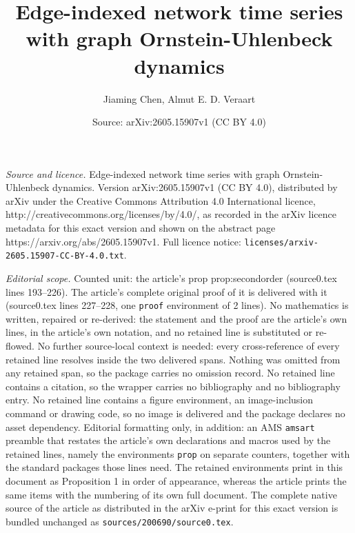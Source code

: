 \documentclass[10pt,a4paper]{amsart}
\title{Edge-indexed network time series with graph Ornstein-Uhlenbeck dynamics}
\author{Jiaming Chen, Almut E. D. Veraart}
\date{Source: arXiv:2605.15907v1 (CC BY 4.0)}
\begin{document}
\maketitle

\noindent\emph{Source and licence.} Edge-indexed network time series with graph Ornstein-Uhlenbeck dynamics. Version arXiv:2605.15907v1 (CC BY 4.0), distributed by arXiv under the Creative Commons Attribution 4.0 International licence, http://creativecommons.org/licenses/by/4.0/, as recorded in the arXiv licence metadata for this exact version and shown on the abstract page https://arxiv.org/abs/2605.15907v1. Full licence notice: \texttt{licenses/arxiv-2605.15907-CC-BY-4.0.txt}.\par\smallskip

\noindent\textit{Editorial scope.} Counted unit: the article's prop prop:secondorder (source0.tex lines 193--226). The article's complete original proof of it is delivered with it (source0.tex lines 227--228, one \texttt{proof} environment of 2 lines). No mathematics is written, repaired or re-derived: the statement and the proof are the article's own lines, in the article's own notation, and no retained line is substituted or re-flowed.  No further source-local context is needed: every cross-reference of every retained line resolves inside the two delivered spans.  Nothing was omitted from any retained span, so the package carries no omission record.  No retained line contains a citation, so the wrapper carries no bibliography and no bibliography entry.  No retained line contains a figure environment, an image-inclusion command or drawing code, so no image is delivered and the package declares no asset dependency.  Editorial formatting only, in addition: an AMS \texttt{amsart} preamble that restates the article's own declarations and macros used by the retained lines, namely the environments \texttt{prop} on separate counters, together with the standard packages those lines need.  The retained environments print in this document as Proposition 1 in order of appearance, whereas the article prints the same items with the numbering of its own full document.  The complete native source of the article as distributed in the arXiv e-print for this exact version is bundled unchanged as \texttt{sources/200690/source0.tex}.
\end{document}
